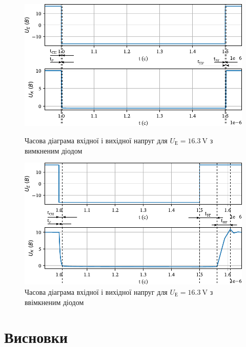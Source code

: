 \documentclass[a4paper,oneside,DIV=10,12pt]{scrartcl}
\begin{document}
		\begin{figure}[p]
			\centering
			\includegraphics[width=\textwidth]{03-16p3-01-nodiode-edited.pdf}
			\caption{Часова діаграма вхідної і вихідної напруг для $U_{\text{Е}} = \SI{16,3}{\volt}$ з вимкненим діодом}
			
			\vspace*{\floatsep}
		
			\centering
			\includegraphics[width=\textwidth]{03-16p3-02-diode-edited.pdf}
			\caption{Часова діаграма вхідної і вихідної напруг для $U_{\text{Е}} = \SI{16,3}{\volt}$ з ввімкненим діодом}
		\end{figure}
		
	\section{Висновки}
		
\end{document}
